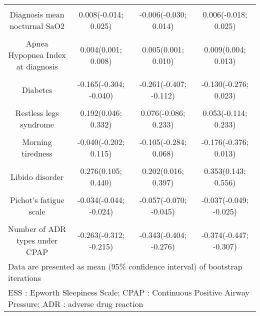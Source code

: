 \documentclass{article}
\begin{document}
\begin{table}[H]
\begin{tabular}[t]{cccc}
\cellcolor{gray!6}{Diagnosis micro awake index} & \cellcolor{gray!6}{-0.001(-0.004; 0.003)} & \cellcolor{gray!6}{0.006(0.002; 0.010)} & \cellcolor{gray!6}{0.003(-0.001; 0.007)}\\
Diagnosis mean nocturnal SaO2 & 0.008(-0.014; 0.025) & -0.006(-0.030; 0.014) & 0.006(-0.018; 0.025)\\
\cellcolor{gray!6}{Diagnosis delay between visit and sleep examination} & \cellcolor{gray!6}{0.000(-0.000; 0.000)} & \cellcolor{gray!6}{0.000(-0.000; 0.000)} & \cellcolor{gray!6}{0.000(-0.000; 0.000)}\\
Apnea Hypopnea Index at diagnosis & 0.004(0.001; 0.008) & 0.005(0.001; 0.010) & 0.009(0.004; 0.013)\\
\cellcolor{gray!6}{Gender (male)} & \cellcolor{gray!6}{0.086(-0.071; 0.248)} & \cellcolor{gray!6}{-0.033(-0.217; 0.159)} & \cellcolor{gray!6}{-0.222(-0.408; -0.027)}\\
Diabetes & -0.165(-0.304; -0.040) & -0.261(-0.407; -0.112) & -0.130(-0.276; 0.023)\\
\cellcolor{gray!6}{Hypercholesterolemia} & \cellcolor{gray!6}{0.050(-0.080; 0.178)} & \cellcolor{gray!6}{0.088(-0.061; 0.231)} & \cellcolor{gray!6}{0.114(-0.033; 0.263)}\\
Restless legs syndrome & 0.192(0.046; 0.332) & 0.076(-0.086; 0.233) & 0.053(-0.114; 0.233)\\
\cellcolor{gray!6}{Daytime sleepiness} & \cellcolor{gray!6}{-0.096(-0.258; 0.064)} & \cellcolor{gray!6}{-0.060(-0.240; 0.117)} & \cellcolor{gray!6}{-0.177(-0.371; 0.000)}\\
Morning tiredness & -0.040(-0.202; 0.115) & -0.105(-0.284; 0.068) & -0.176(-0.376; 0.013)\\
\cellcolor{gray!6}{Morning headaches} & \cellcolor{gray!6}{0.054(-0.111; 0.217)} & \cellcolor{gray!6}{0.081(-0.112; 0.276)} & \cellcolor{gray!6}{-0.025(-0.226; 0.173)}\\
Libido disorder & 0.276(0.105; 0.440) & 0.202(0.016; 0.397) & 0.353(0.143; 0.556)\\
\cellcolor{gray!6}{Night sweating} & \cellcolor{gray!6}{-0.051(-0.203; 0.111)} & \cellcolor{gray!6}{-0.104(-0.285; 0.062)} & \cellcolor{gray!6}{-0.234(-0.437; -0.051)}\\
Pichot's fatigue scale & -0.034(-0.044; -0.024) & -0.057(-0.070; -0.045) & -0.037(-0.049; -0.025)\\
\cellcolor{gray!6}{Average pressure of CPAP} & \cellcolor{gray!6}{0.055(0.030; 0.081)} & \cellcolor{gray!6}{0.076(0.048; 0.105)} & \cellcolor{gray!6}{0.116(0.085; 0.144)}\\
Number of ADR types under CPAP & -0.263(-0.312; -0.215) & -0.343(-0.404; -0.276) & -0.374(-0.447; -0.307)\\
\bottomrule
\multicolumn{4}{l}{\rule{0pt}{1em}Data are presented as mean (95\% confidence interval) of bootstrap iterations}\\
\multicolumn{4}{l}{\rule{0pt}{1em}ESS : Epworth Sleepiness Scale; CPAP : Continuous Positive Airway Pressure; ADR : adverse drug reaction}\\
\end{tabular}
\end{table}
\clearpage
\begingroup\fontsize{6}{8}\selectfont
\end{document}
